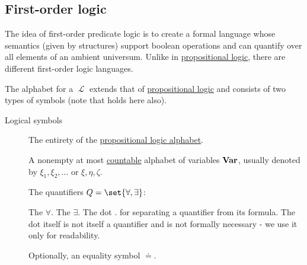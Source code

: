 \subsection{First-order logic}\label{subsec:first_order_logic}

\begin{definition}\label{def:first_order_language}\mcite\cite[187]{OpenLogic20201202}
  The idea of first-order predicate logic is to create a formal language whose semantics (given by structures) support boolean operations and can quantify over all elements of an ambient universum. Unlike in \hyperref[subsec:propositional_logic]{propositional logic}, there are different first-order logic languages.

  The alphabet for a  \( \mscrL \) extends that of \hyperref[subsec:propositional_logic]{propositional logic} and consists of two types of symbols (note that  holds here also).

  \begin{description}
    \item[Logical symbols]
    \hfill
    \begin{thmenum}[series=def:first_order_language]
       The entirety of the \hyperref[subsec:propositional_logic]{propositional logic alphabet}.

       A nonempty at most \hyperref[rem:cardinals/countable]{countable} alphabet of variables \( \operatorname{\mathbf{Var}} \), usually denoted by \( \xi_1, \xi_2, \ldots \) or \( \xi, \eta, \zeta \).

       The quantifiers \( Q = \set{ \forall, \exists } \):
      \begin{thmenum}
         The  \( \forall \).
         The  \( \exists \).
         The dot \( . \) for separating a quantifier from its formula. The dot itself is not itself a quantifier and is not formally necessary - we use it only for readability.
      \end{thmenum}

       Optionally, an equality symbol \( \doteq \).
    \end{thmenum}


\end{description}
\end{definition}
